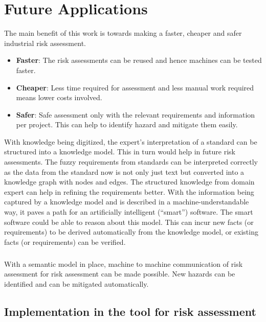 \chapter{Future Applications} \label{applications}

\bigskip \bigskip 

The main benefit of this work is towards making a faster, cheaper and safer industrial risk assessment.   
\begin{itemize}
	\item \textbf{Faster}: The risk assessments can be reused and hence machines can be tested faster.
	\item \textbf{Cheaper}: Less time required for assessment and less manual work required means lower costs involved.
	\item \textbf{Safer}: Safe assessment only with the relevant requirements and information per project. This can help to identify hazard and mitigate them easily.
\end{itemize}

With knowledge being digitized, the expert's interpretation of a standard can be structured into a knowledge model. This in turn would help in future risk assessments. The fuzzy requirements from standards can be interpreted correctly as the data from the standard now is not only just text but converted into a knowledge graph with nodes and edges. The structured knowledge from domain expert can help in refining the requirements better. With the information being captured by a knowledge model and is described in a machine-understandable way, it paves a path for an artificially intelligent (“smart”) software. The smart software could be able to reason about this model. This can incur new facts (or requirements) to be derived automatically from the knowledge model, or existing facts (or requirements) can be verified. 

\paragraph{} With a semantic model in place, machine to machine communication of risk assessment for risk assessment can be made possible. New hazards can be identified and can be mitigated automatically. 

\section{Implementation in the tool for risk assessment}

